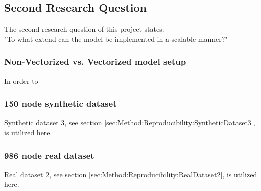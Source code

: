 \subsection{Second Research Question}
\label{sec:ResearchQuestion2}
The second research question of this project states:
\\
"To what extend can the model be implemented in a scalable manner?"



\subsubsection{Non-Vectorized vs. Vectorized model setup}
\label{sec:ResearchQuestion2:comparison}
In order to 



\subsubsection{150 node synthetic dataset}
\label{sec:ResearchQuestion2:150nodeSynthetic}

Synthetic dataset 3, see section \ref{sec:Method:Reproducibility:SyntheticDataset3}, is utilized here.
   
   

\subsubsection{986 node real dataset}
\label{sec:ResearchQuestion2:986nodeReal}

Real dataset 2, see section \ref{sec:Method:Reproducibility:RealDataset2}, is utilized here.
   
